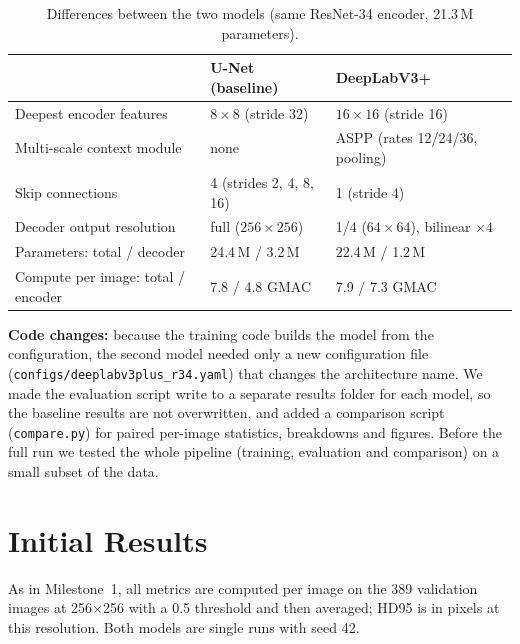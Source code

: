 \documentclass[11pt,a4paper]{article}
\begin{document}
\begin{table}[htbp]
\centering
\begin{tabular}{lll}
\toprule
& \textbf{U-Net (baseline)} & \textbf{DeepLabV3+} \\
\midrule
Deepest encoder features & $8\times8$ (stride 32) & $16\times16$ (stride 16) \\
Multi-scale context module & none & ASPP (rates 12/24/36, pooling) \\
Skip connections & 4 (strides 2, 4, 8, 16) & 1 (stride 4) \\
Decoder output resolution & full ($256\times256$) & 1/4 ($64\times64$), bilinear $\times4$ \\
Parameters: total / decoder & 24.4\,M / 3.2\,M & 22.4\,M / 1.2\,M \\
Compute per image: total / encoder & 7.8 / 4.8 GMAC & 7.9 / 7.3 GMAC \\
\bottomrule
\end{tabular}
\caption{Differences between the two models (same ResNet-34 encoder, 21.3\,M parameters).}
\end{table}

\textbf{Code changes:} because the training code builds the model from the configuration, the
second model needed only a new configuration file (\nolinkurl{configs/deeplabv3plus_r34.yaml}) that
changes the architecture name. We made the evaluation script write to a separate results folder
for each model, so the baseline results are not overwritten, and added a comparison script
(\texttt{compare.py}) for paired per-image statistics, breakdowns and figures.
Before the full run we tested the whole pipeline (training, evaluation and comparison) on a small
subset of the data.

\section{Initial Results}

As in Milestone~1, all metrics are computed per image on the 389 validation images at
256$\times$256 with a 0.5 threshold and then averaged; HD95 is in pixels at this resolution. Both
models are single runs with seed 42.
\end{document}
